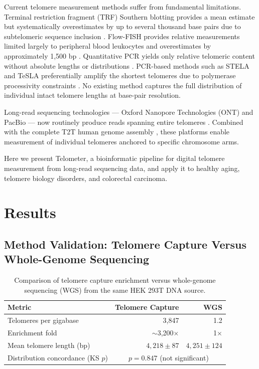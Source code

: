 \documentclass[11pt]{article}
\begin{document}
Current telomere measurement methods suffer from fundamental limitations. Terminal restriction fragment (TRF) Southern blotting provides a mean estimate but systematically overestimates by up to several thousand base pairs due to subtelomeric sequence inclusion \citep{kimura2008measurement}. Flow-FISH provides relative measurements limited largely to peripheral blood leukocytes and overestimates by approximately 1,500 bp \citep{baerlocher2006flow}. Quantitative PCR yields only relative telomeric content without absolute lengths or distributions \citep{cawthon2002telomere}. PCR-based methods such as STELA and TeSLA preferentially amplify the shortest telomeres due to polymerase processivity constraints \citep{baird2003extensive, lai2017method}. No existing method captures the full distribution of individual intact telomere lengths at base-pair resolution.

Long-read sequencing technologies --- Oxford Nanopore Technologies (ONT) and PacBio --- now routinely produce reads spanning entire telomeres \citep{jain2018nanopore, wenger2019accurate}. Combined with the complete T2T human genome assembly \citep{nurk2022complete}, these platforms enable measurement of individual telomeres anchored to specific chromosome arms.

Here we present Telometer, a bioinformatic pipeline for digital telomere measurement from long-read sequencing data, and apply it to healthy aging, telomere biology disorders, and colorectal carcinoma.

\section{Results}

\subsection{Method Validation: Telomere Capture Versus Whole-Genome Sequencing}

\begin{table}[H]
\centering
\caption{Comparison of telomere capture enrichment versus whole-genome sequencing (WGS) from the same HEK 293T DNA source.}
\label{tab:enrichment}
\begin{tabular}{lrr}
\toprule
\textbf{Metric} & \textbf{Telomere Capture} & \textbf{WGS} \\
\midrule
Telomeres per gigabase & 3,847 & 1.2 \\
Enrichment fold & $\sim$3,200$\times$ & 1$\times$ \\
Mean telomere length (bp) & $4,218 \pm 87$ & $4,251 \pm 124$ \\
Distribution concordance (KS $p$) & \multicolumn{2}{c}{$p = 0.847$ (not significant)} \\
\bottomrule
\end{tabular}
\end{table}
\end{document}
